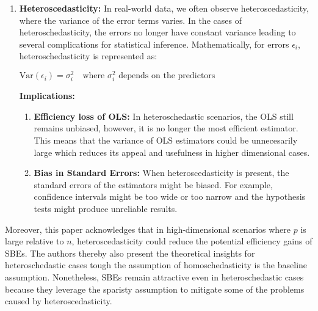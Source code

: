 \begin{enumerate}
\item \textbf{Heteroscedasticity:} In real-world data, we often observe heteroscedasticity, where the variance of the error terms varies. In the cases of heteroschedasticity, the errors no longer have constant variance leading to several complications for statistical inference. Mathematically, for errors $\epsilon_i$, heteroschedasticity is represented as:
\begin{center}
    $\text{Var}(\epsilon_i) = \sigma_i^2 \quad \text{where } \sigma_i^2 \text{ depends on the predictors}$
\end{center}
\textbf{Implications:}
\begin{enumerate}
    \item \textbf{Efficiency loss of OLS:} In heteroschedastic scenarios, the OLS still remains unbiased, however, it is no longer the most efficient estimator. This means that the variance of OLS estimators could be unnecesarily large which reduces its appeal and usefulness in higher dimensional cases. 
    \item \textbf{Bias in Standard Errors:} When heteroscedasticity is present, the standard errors of the estimators might be biased. For example, confidence intervals might be too wide or too narrow and the hypothesis tests might produce unreliable results. 
\end{enumerate}

\end{enumerate}
Moreover, this paper acknowledges that in high-dimensional scenarios where $p$ is large relative to $n$, heteroscedasticity could reduce the potential efficiency gains of SBEs. The authors thereby also present the theoretical insights for heteroschedastic cases tough the assumption of homoschedasticity is the baseline assumption. Nonetheless, SBEs remain attractive even in heteroschedastic cases because they leverage the sparisty assumption to mitigate some of the problems caused by heteroscedasticity. 


